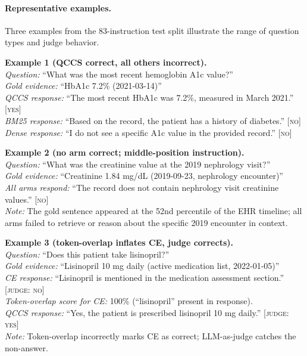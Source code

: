 \documentclass{article}
\begin{document}
\paragraph{Representative examples.}
Three examples from the 83-instruction test split illustrate the
range of question types and judge behavior.

\noindent\textbf{Example 1 (QCCS correct, all others incorrect).}\\
\textit{Question:} ``What was the most recent hemoglobin A1c value?''\\
\textit{Gold evidence:} ``HbA1c 7.2\% (2021-03-14)''\\
\textit{QCCS response:} ``The most recent HbA1c was 7.2\%, measured in March 2021.'' \textsc{[yes]}\\
\textit{BM25 response:} ``Based on the record, the patient has a history of diabetes.'' \textsc{[no]}\\
\textit{Dense response:} ``I do not see a specific A1c value in the provided record.'' \textsc{[no]}

\noindent\textbf{Example 2 (no arm correct; middle-position instruction).}\\
\textit{Question:} ``What was the creatinine value at the 2019 nephrology visit?''\\
\textit{Gold evidence:} ``Creatinine 1.84 mg/dL (2019-09-23, nephrology encounter)''\\
\textit{All arms respond:} ``The record does not contain nephrology visit creatinine values.'' \textsc{[no]}\\
\textit{Note:} The gold sentence appeared at the 52nd percentile of the EHR timeline;
all arms failed to retrieve or reason about the specific 2019 encounter in context.

\noindent\textbf{Example 3 (token-overlap inflates CE, judge corrects).}\\
\textit{Question:} ``Does this patient take lisinopril?''\\
\textit{Gold evidence:} ``Lisinopril 10 mg daily (active medication list, 2022-01-05)''\\
\textit{CE response:} ``Lisinopril is mentioned in the medication assessment section.'' \textsc{[judge: no]}\\
\textit{Token-overlap score for CE:} 100\% (``lisinopril'' present in response).\\
\textit{QCCS response:} ``Yes, the patient is prescribed lisinopril 10 mg daily.'' \textsc{[judge: yes]}\\
\textit{Note:} Token-overlap incorrectly marks CE as correct; LLM-as-judge catches the non-answer.
\end{document}
